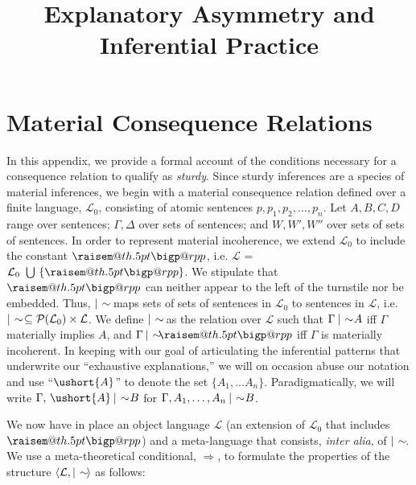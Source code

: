 \documentclass{article}                     %
\makeatletter
\newcommand{\raisemath}[1]{\mathpalette{\raisem@th{#1}}}
\newcommand{\raisem@th}[3]{\raisebox{#1}{$#2#3$}}
\newcommand{\nmc}{%
	\mathbin{\mathpalette\nm@\expandafter}
}
\newcommand{\nm@}{\mid\joinrel\mkern-.5mu\sim\mkern-3mu}
\newcommand{\bigperpp}{%
	\mathop{\mathpalette\bigp@rpp\relax}%
	\displaylimits
}
\newcommand{\bigp@rpp}[2]{%
	\vcenter{
		\m@th\hbox{\scalebox{\ifx#1\displaystyle1.3\else1.3\fi}{$#1\perp$}}
	}%
}
\newcommand{\bigperp}{\raisemath{.5pt}{\bigperpp}}
\makeatother
\begin{document}
\sloppy
\title{Explanatory Asymmetry and Inferential Practice
}


\raggedbottom

\maketitle



\section{Material Consequence Relations}\label{sec:MatCon}

In this appendix, we provide a formal account of the conditions necessary for a consequence relation to qualify as \textit{sturdy}. Since sturdy inferences are a species of material inferences, we begin with a material consequence relation defined over a finite language, $ \mathcal{L}_{0} $, consisting of atomic sentences $ p, p_1, p_2, \ldots, p_n$. Let $ A, B, C, D $ range over sentences; $ \Gamma, \Delta$ over sets of sentences; and $ W, W',W'' $ over sets of sets of sentences. In order to represent material incoherence, we extend $ \mathcal{L}_0 $ to include the constant $ \bigperp $, i.e. $ \mathcal{L} $ = $ \mathcal{L}_0 \,\,\bigcup \,\,\{\bigperp\}$. We stipulate that $ \bigperp $ can neither appear to the left of the turnstile nor be embedded. Thus, $\nmc$ maps sets of sets of sentences in $ \mathcal{L}_{0} $ to sentences in $ \mathcal{L}$, i.e. $\nmc\subseteq \mathcal{P}(\mathcal{L}_0) \times \mathcal{L} $. We define $ \nmc $ as the relation over $ \mathcal{L} $ such that $  \Gamma\nmc A $ iff  $\Gamma$ materially implies $ A $, and $\Gamma\nmc\!\!\bigperp $ iff $ \Gamma $ is materially incoherent. In keeping with our goal of articulating the inferential patterns that underwrite our ``exhaustive explanations,'' we will on occasion abuse our notation and use ``$\ushort{A}$'' to denote the set $ \{A_1, \dots A_n\} $. Paradigmatically, we will write $\Gamma,\, \ushort{A} \nmc B $ for $\Gamma, A_1,\ldots,A_n \nmc B $. 

We now have in place an object language $ \mathcal{L} $ (an extension of  $ \mathcal{L}_0 $ that includes $ \bigperp $) and a meta-language that consists, \textit{inter alia}, of $ \nmc $.  We use a meta-theoretical conditional, $ \Longrightarrow $, to formulate the properties of the structure $ \langle \mathcal{L}, \nmc \rangle $ as follows:
\end{document}

